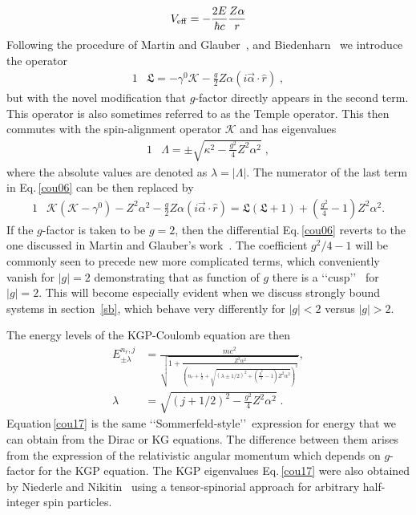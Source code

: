 \begin{alignat}{1}
	\label{temp} V_{\rm eff}=-\frac{2E}{\hbar c}\frac{Z\alpha}{r}
\end{alignat}
Following the procedure of Martin and Glauber~\cite{Martin:1958zz}, and Biedenharn~\cite{bi62} we introduce the operator
\begin{alignat}{1}
\label{cou07} &\mathfrak{L}=-\gamma^{0}\mathcal{K}-\frac{g}{2}Z\alpha(i\vec{\alpha}\cdot\hat{r})\;,
\end{alignat}
but with the novel modification that $g$-factor directly appears in the second term. This operator is also sometimes referred to as the Temple operator. This then commutes with the spin-alignment operator $\mathcal{K}$ and has eigenvalues
\begin{alignat}{1}
\label{cou08} &\Lambda=\pm\sqrt{\kappa^{2}-\displaystyle\frac{\displaystyle g^{2}}{4}Z^{2}\alpha^{2}}\;,\end{alignat}
where the absolute values are denoted as $\lambda=|\Lambda|$. The numerator of the last term in Eq.\,\eqref{cou06} can be then replaced by
\begin{alignat}{1}
\label{cou09} &\mathcal{K}(\mathcal{K}-\gamma^{0})-Z^{2}\alpha^{2}-\frac{g}{2}Z\alpha(i\vec{\alpha}\cdot\hat{r})=\mathfrak{L}(\mathfrak{L}+1)+\left(\frac{g^{2}}{4}-1\right)Z^{2}\alpha^{2}.
\end{alignat}
If the $g$-factor is taken to be $g=2$, then the differential Eq.\,\eqref{cou06} reverts to the one discussed in Martin and Glauber\rq s work~\cite{Martin:1958zz}. The coefficient $g^{2}/4-1$ will be commonly seen to precede new more complicated terms, which conveniently vanish for $|g|=2$ demonstrating that as function of $g$ there is a \lq\lq cusp\rq\rq~\cite{Rafelski:2012ui} for $|g|=2$. This will become especially evident when we discuss strongly bound systems in section~\ref{sb}, which behave very differently for $|g|<2$ versus $|g|>2$. 

The energy levels of the KGP-Coulomb equation are then
\begin{subequations}
\begin{alignat}{1}
\label{cou17} E_{\pm\lambda}^{n_{r},j}&=\frac{mc^{2}}{\sqrt{1+\displaystyle\frac{Z^{2}\alpha^{2}}{\left(n_{r}+\frac{1}{2}+\sqrt{(\lambda\pm1/2)^{2}+\left(\frac{g^{2}}{4}-1\right)Z^{2}\alpha^{2}}\right)^{2}}}},\\[0.2cm]
\label{cou17c} \lambda&=\sqrt{\displaystyle(j+1/2)^{2}-\frac{\displaystyle g^{2}}{4}Z^{2}\alpha^{2}}\;.
\end{alignat}
\end{subequations}
Equation\,\eqref{cou17} is the same \lq\lq Sommerfeld-style\rq\rq\ expression for energy that we can obtain from the Dirac or KG equations. The difference between them arises from the expression of the relativistic angular momentum which depends on $g$-factor for the KGP equation. The KGP eigenvalues Eq.\,\eqref{cou17} were also obtained by Niederle and Nikitin~\cite{Niederle:2004bx} using a tensor-spinorial approach for arbitrary half-integer spin particles.

